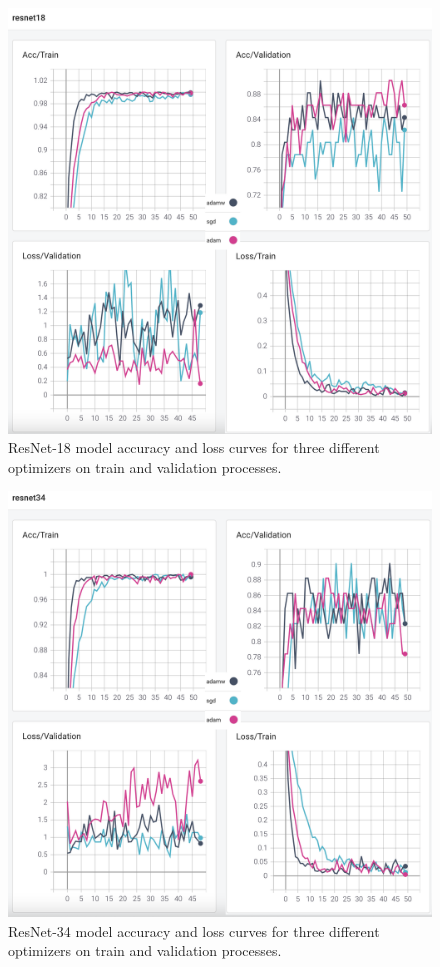 \begin{figure}[!h]
    \centering
    \includegraphics[width=\linewidth]{fig/resnet18.png}
    \vspace{2mm}
    \caption{ResNet-18 model accuracy and loss curves for three different optimizers on train and validation processes.}
    \label{fig:resnet18_plots}
\end{figure}

\begin{figure}[!h]
    \centering
    \includegraphics[width=\linewidth]{fig/resnet34.png}
    \vspace{2mm}
    \caption{ResNet-34 model accuracy and loss curves for three different optimizers on train and validation processes.}
    \label{fig:resnet34_plots}
\end{figure}

